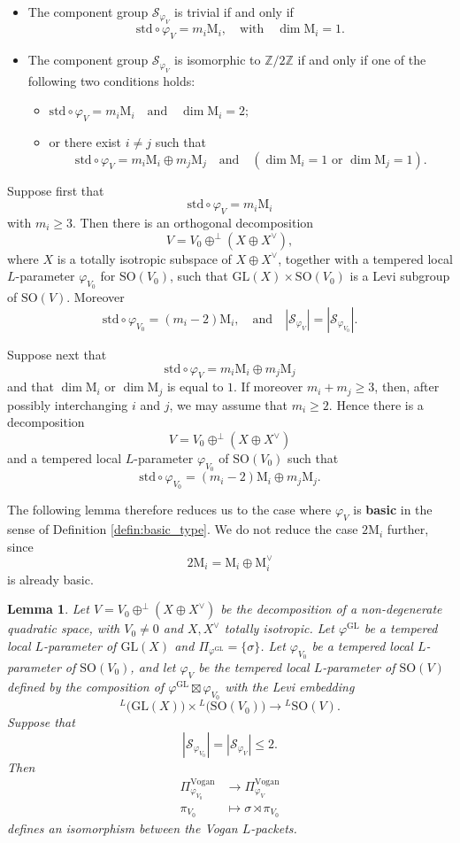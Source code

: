 \documentclass[12pt]{amsart}
\numberwithin{equation}{subsection}
\newcommand{\BZ}{{\mathbb {Z}}}
\newcommand{\CS}{{\mathcal {S}}}
\newcommand{\RM}{{\mathrm {M}}}
\newcommand{\GL}{{\mathrm{GL}}}
\newcommand{\SO}{{\mathrm{SO}}}
\def\std{\mathrm{std}}
\def\vphi{\varphi}
\def\SO{\mathrm{SO}}
\newtheorem{lem}[thm]{Lemma}
\begin{document}
\begin{itemize}
\item The component group $\CS_{\vphi_V}$ is trivial if and only if
\[
\std\circ \vphi_V = m_i\RM_i,\quad \text{with}\quad \dim \RM_i=1.
\]

\item The component group $\CS_{\vphi_V}$ is isomorphic to $\BZ/2\BZ$ if and
only if one of the following two conditions holds:
\begin{itemize}
    \item
$
\std\circ \vphi_V = m_i\RM_i\quad \text{and}\quad \dim \RM_i=2;
$
    \item or there exist $i\neq j$ such that
\[
\std \circ \vphi_V = m_i\RM_i\oplus m_j\RM_j\quad \text{and}\quad
(
\dim \RM_i=1 \text{ or }\dim \RM_j =1
).
\]
\end{itemize}
\end{itemize}

Suppose first that
\[
\std\circ \vphi_V = m_i\RM_i
\]
with $m_i\geq 3$. Then there is an orthogonal decomposition
\[
V=V_0\oplus^\perp (X\oplus X^\vee),
\]
where $X$ is a totally isotropic subspace of $X\oplus X^\vee$, together with a
tempered local $L$-parameter $\vphi_{V_0}$ for $\SO(V_0)$, such that
$\GL(X)\times \SO(V_0)$ is a Levi subgroup of $\SO(V)$. Moreover
\[
\std\circ \vphi_{V_0} = (m_i-2)\RM_i,\quad
\text{and}\quad
|\CS_{\vphi_V}| = |\CS_{\vphi_{V_0}}|.
\]

Suppose next that
\[
\std \circ \vphi_V = m_i\RM_i\oplus m_j\RM_j
\]
and that $\dim \RM_i$ or $\dim \RM_j$ is equal to $1$. If moreover
$m_i+m_j\geq 3$, then, after possibly interchanging $i$ and $j$, we may assume
that $m_i\geq 2$. Hence there is a decomposition
\[
V=V_0\oplus^\perp (X\oplus X^\vee)
\]
and a tempered local $L$-parameter $\vphi_{V_0}$ of $\SO(V_0)$ such that
\[
\std\circ \varphi_{V_0}=(m_i-2)\RM_i\oplus m_j\RM_j.
\]

The following lemma therefore reduces us to the case where $\vphi_V$ is
\textbf{basic} in the sense of Definition \ref{defin:basic_type}. We do not
reduce the case $2\RM_i$ further, since
\[
2\RM_i = \RM_i\oplus \RM_i^\vee
\]
is already basic.

\begin{lem}
Let $V=V_0\oplus^\perp(X\oplus X^{\vee})$ be the decomposition of a non-degenerate quadratic space, with $V_0\neq 0$ and $X,X^{\vee}$ totally isotropic. Let $\varphi^{\GL}$ be a tempered local $L$-parameter of $\GL(X)$ and $\Pi_{\varphi^{\GL}}=\{\sigma\}$. Let $\varphi_{V_0}$ be a tempered local $L$-parameter of $\SO(V_0)$, and let $\varphi_V$ be the tempered local $L$-parameter of $\SO(V)$ defined by the composition of $\varphi^{\GL}\boxtimes\varphi_{V_0}$ with the Levi embedding
\[
{}^L\big(\GL(X)\big)\times {}^L\big(\SO(V_0)\big)\to {}^L\SO(V).
\]
Suppose that
\[
|\CS_{\varphi_{V_0}}|=|\CS_{\varphi_{V}}|\leqslant 2.
\]
Then
\begin{align*}
\Pi_{\varphi_{V_0}}^{\mathrm{Vogan}}&\to \Pi_{\varphi_{V}}^{\mathrm{Vogan}}
\\
\pi_{V_0} &\mapsto \sigma\rtimes \pi_{V_0}
\end{align*}
defines an isomorphism between the Vogan $L$-packets.
\end{lem}
\end{document}
